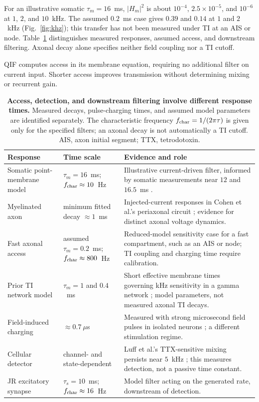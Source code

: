 \documentclass[11pt,a4paper]{article}
\begin{document}
For an illustrative somatic $\tau_m=16$~ms, $|H_m|^2$ is about
$10^{-4}$, $2.5\times10^{-5}$, and $10^{-6}$ at $1$, $2$, and $10$~kHz.
The assumed $0.2$~ms case gives $0.39$ and $0.14$ at $1$ and $2$~kHz
(Fig.~\ref{fig:khz}); this transfer has not been measured under TI at an
AIS or node. Table~\ref{tab:doors} distinguishes measured responses,
assumed access, and downstream filtering. Axonal decay alone specifies
neither field coupling nor a TI cutoff.

QIF computes access in its membrane equation, requiring no additional filter
on current input. Shorter access improves transmission without determining
mixing or recurrent gain.

\begin{table}[h]
\centering\small
\renewcommand{\arraystretch}{1.15}
\begin{tabular}{@{}>{\raggedright\arraybackslash}p{2.8cm}
>{\raggedright\arraybackslash}p{3.5cm}
>{\raggedright\arraybackslash}p{8.6cm}@{}}
\toprule
Response & Time scale & Evidence and role \\
\midrule
Somatic point-membrane model & $\tau_m=16$~ms; $f_{\rm char}\approx10$~Hz &
Illustrative current-driven filter, informed by somatic measurements near $12$ and $16.5$~ms
\cite{deitcher2017,eyal2016}. \\
Myelinated axon & minimum fitted decay $\approx1$~ms &
Injected-current responses in Cohen et al.'s periaxonal circuit
\cite{cohen2020periaxonal}; evidence for distinct axonal voltage dynamics. \\
Fast axonal access & assumed $\tau_m=0.2$~ms; $f_{\rm char}\approx800$~Hz &
Reduced-model sensitivity case for a fast compartment, such as an AIS or node;
TI coupling and charging time require calibration. \\
Prior TI network model & $\tau_m=1$ and $0.4$~ms &
Short effective membrane times governing kHz sensitivity in a gamma network
\cite{esmaeilpour2021}; model parameters, not measured axonal TI decays. \\
Field-induced charging & $\approx0.7~\mu$s &
Measured with strong microsecond field pulses in isolated neurons
\cite{semenov2025}; a different stimulation regime. \\
Cellular detector & channel- and state-dependent &
Luff et al.'s TTX-sensitive mixing persists near $5$~kHz
\cite{luff2024mixer}; this measures detection, not a passive time constant. \\
JR excitatory synapse & $\tau_s=10$~ms; $f_{\rm char}\approx16$~Hz &
Model filter acting on the generated rate, downstream of detection. \\
\bottomrule
\end{tabular}
\caption{\textbf{Access, detection, and downstream filtering involve different response
times.} Measured decays, pulse-charging times, and assumed model parameters are
identified separately. The characteristic frequency $f_{\rm char}=1/(2\pi\tau)$
is given only for the specified filters; an axonal decay is not automatically a TI
cutoff. AIS, axon initial segment; TTX, tetrodotoxin.}
\label{tab:doors}
\end{table}
\end{document}
